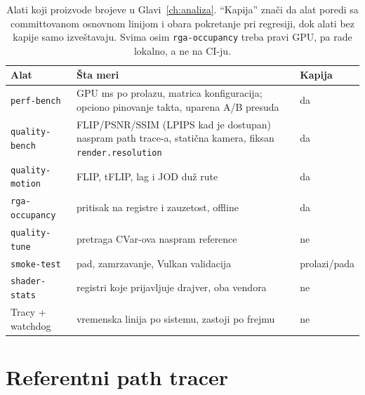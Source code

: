 \begin{table}[tbp]
\caption[Alati za merenje]{Alati koji proizvode brojeve u Glavi~\ref{ch:analiza}. ``Kapija'' zna\v{c}i da alat poredi sa committovanom osnovnom linijom i obara pokretanje pri regresiji, dok alati bez kapije samo izve\v{s}tavaju. Svima osim \texttt{rga-occupancy} treba pravi GPU, pa rade lokalno, a ne na CI-ju.}
\label{tab:tooling}
\centering
\begin{tabular}{lp{}l}
\toprule
Alat & \v{S}ta meri & Kapija \\
\midrule
\texttt{perf-bench}     & GPU ms po prolazu, matrica konfiguracija; opciono pinovanje takta, uparena A/B presuda & da \\
\texttt{quality-bench}  & FLIP/PSNR/SSIM (LPIPS kad je dostupan) naspram path trace-a, stati\v{c}na kamera, fiksan \texttt{render.resolution} & da \\
\texttt{quality-motion} & FLIP, tFLIP, lag i JOD du\v{z} rute & da \\
\texttt{rga-occupancy}  & pritisak na registre i zauzetost, offline & da \\
\texttt{quality-tune}   & pretraga CVar-ova naspram reference & ne \\
\texttt{smoke-test}     & pad, zamrzavanje, Vulkan validacija & prolazi/pada \\
\texttt{shader-stats}   & registri koje prijavljuje drajver, oba vendora & ne \\
Tracy + watchdog        & vremenska linija po sistemu, zastoji po frejmu & ne \\
\bottomrule
\end{tabular}
\end{table}

\section{Referentni path tracer}
\label{sec:pathtracer}

